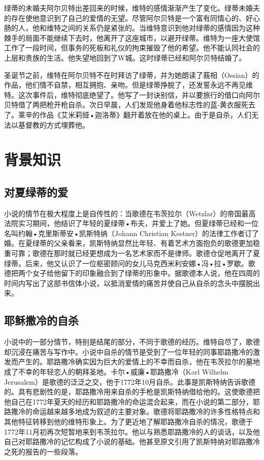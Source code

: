 \documentclass[12pt,oneside]{book}
\begin{document}
绿蒂的未婚夫阿尔贝特出差回来的时候，维特的感情渐渐产生了变化。绿蒂未婚夫的存在使他意识到了自己的爱情的无望。尽管阿尔贝特是一个富有同情心的、好心肠的人，他和维特之间的关系仍是紧张的。当维特意识到他对绿蒂的感情因为这种棘手的局面不能继续下去时，他离开了这座城市，以避开绿蒂。维特为一座大使馆工作了一段时间，但事务的死板和礼仪的拘束摧毁了他的希望。他不能认同社会的上层和贵族的生活。他失望地回到了W城。这时绿蒂已经和阿尔贝特结婚了。

圣诞节之前，维特在阿尔贝特不在时拜访了绿蒂，并为她朗读了莪相（Ossian）的作品，他们情不自禁，相互拥抱、亲吻。但是绿蒂挣脱了，还发誓永远不再见维特。这次事件后，维特彻底绝望了。他写了一封诀别信，并以要旅行的借口向阿尔贝特借了两把枪开枪自杀。次日早晨，人们发现他身着他标志性的蓝-黄衣服死去了。莱辛的作品《艾米莉娅•迦洛蒂》翻开着放在他的桌上。由于是自杀，人们无法以基督教的方式埋葬他。


\chapter{背景知识}
\section{对夏绿蒂的爱}
小说的情节在极大程度上是自传性的：当歌德在韦茨拉尔（Wetzlar）的帝国最高法院实习期间，他结识了年轻的夏绿蒂•布夫，并爱上了她。但夏绿蒂已经和一位名叫约翰•克里斯蒂安•凯斯特纳（Johann Christian Kestner）的法律工作者订了婚。在夏绿蒂的父亲看来，凯斯特纳显然比年轻、有着艺术方面抱负的歌德更加稳重可靠；歌德在那时就已经更想成为一名艺术家而不是律师。歌德仓促地离开了夏绿蒂。后来，他又认识了一位枢密顾问的女儿马克西米利安娜•冯•拉•罗歇。歌德把两个女子给他留下的印象融合到了绿蒂的形象中。据歌德本人说，他在四周的时间内写出了这部书信体小说，以抵消爱情的痛苦并使自己从自杀的念头中摆脱出来。


\section{耶稣撒冷的自杀}
小说中的一部分情节，特别是结尾的部分，不同于歌德的经历。维特自尽了，歌德却沉浸在痛苦与写作中。小说中自杀的情节是受到了一位年轻的同事耶路撒冷的激发而产生的。耶路撒冷确实因为巨大的爱情上的不幸而自杀，他在韦茨拉尔的墓地成了不幸的年轻恋人的朝拜圣地。卡尔•威廉•耶路撒冷（Karl Wilhelm Jerusalem）是歌德的泛泛之交，他于1772年10月自杀。此事是凯斯特纳告诉歌德的。具有悲剧性的是，耶路撒冷用来自杀的手枪是凯斯特纳借给他的。这使歌德把他自己在1772年夏天的经历和耶路撒冷的命运混合起来，而在小说的第二部分，耶路撒冷的命运越来越多地成为叙述的主要对象。歌德将耶路撒冷的许多性格特点和其他特征转移到他的维特形象上。为了更近地了解耶路撒冷自杀的情况，歌德于1772年11月初再次短暂地来到韦茨拉尔。他以与熟悉耶路撒冷的人的谈话，以及他自己对耶路撒冷的记忆构成了小说的基础。他甚至原文引用了凯斯特纳对耶路撒冷之死的报告的一些段落。
\end{document}

